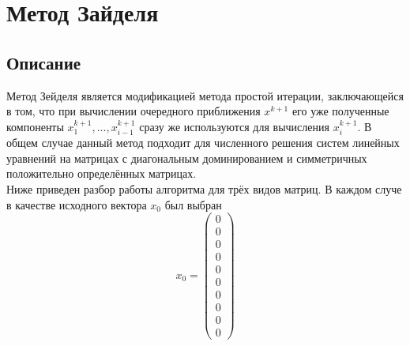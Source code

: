 \documentclass[../../report.tex]{subfiles}
\begin{document}
\chapter{Метод Зайделя}

\section{Описание}
Метод Зейделя является модификацией метода простой итерации, заключающейся в том, что при вычислении 
очередного приближения $x^{k+1}$ его уже полученные компоненты $x_1^{k+1},\dots,x_{i-1}^{k+1}$ сразу 
же используются для вычисления $x_i^{k+1}$. В общем случае данный метод подходит для численного решения 
систем линейных уравнений на матрицах с диагональным доминированием и симметричных положительно определённых матрицах. \\
Ниже приведен разбор работы алгоритма для трёх видов матриц. В каждом случе в качестве исходного вектора $x_0$ был выбран 
\[
x_0 = 
\begin{pmatrix} 
  0 \\ 
  0 \\ 
  0 \\ 
  0 \\ 
  0 \\ 
  0 \\ 
  0 \\ 
  0 \\ 
  0 \\ 
  0 
\end{pmatrix}
\]
\end{document}
